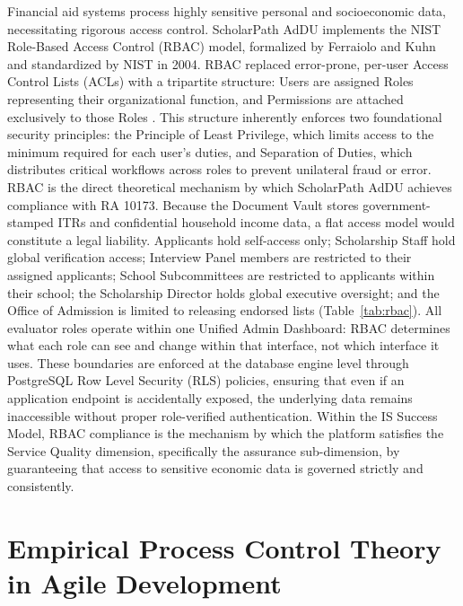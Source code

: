 Financial aid systems process highly sensitive personal and socioeconomic data, necessitating rigorous access control. ScholarPath AdDU implements the NIST Role-Based Access Control (RBAC) model, formalized by Ferraiolo and Kuhn \cite{ref24} and standardized by NIST in 2004. RBAC replaced error-prone, per-user Access Control Lists (ACLs) with a tripartite structure: Users are assigned Roles representing their organizational function, and Permissions are attached exclusively to those Roles \cite{ref38}. This structure inherently enforces two foundational security principles: the Principle of Least Privilege, which limits access to the minimum required for each user's duties, and Separation of Duties, which distributes critical workflows across roles to prevent unilateral fraud or error. RBAC is the direct theoretical mechanism by which ScholarPath AdDU achieves compliance with RA 10173. Because the Document Vault stores government-stamped ITRs and confidential household income data, a flat access model would constitute a legal liability. Applicants hold self-access only; Scholarship Staff hold global verification access; Interview Panel members are restricted to their assigned applicants; School Subcommittees are restricted to applicants within their school; the Scholarship Director holds global executive oversight; and the Office of Admission is limited to releasing endorsed lists (Table~\ref{tab:rbac}). All evaluator roles operate within one Unified Admin Dashboard: RBAC determines what each role can see and change within that interface, not which interface it uses. These boundaries are enforced at the database engine level through PostgreSQL Row Level Security (RLS) policies, ensuring that even if an application endpoint is accidentally exposed, the underlying data remains inaccessible without proper role-verified authentication. Within the IS Success Model, RBAC compliance is the mechanism by which the platform satisfies the Service Quality dimension, specifically the assurance sub-dimension, by guaranteeing that access to sensitive economic data is governed strictly and consistently.

\section{Empirical Process Control Theory in Agile Development}

